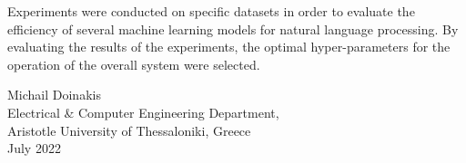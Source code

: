{Experiments were conducted on specific datasets in order to evaluate the efficiency of several machine learning models for natural language processing. By evaluating the results of the experiments, the optimal hyper-parameters for the operation of the overall system were selected.

\begin{flushright}
  \vspace{2cm}
  Michail Doinakis
  \\
  Electrical \& Computer Engineering Department,
  \\
  Aristotle University of Thessaloniki, Greece
  \\
  July 2022
\end{flushright}
}